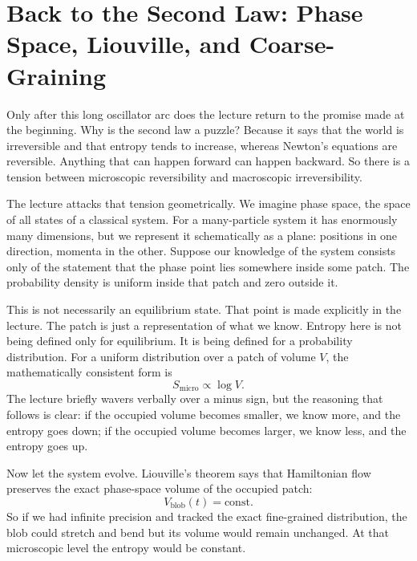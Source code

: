 \section{Back to the Second Law: Phase Space, Liouville, and Coarse-Graining}

Only after this long oscillator arc does the lecture return to the promise made at the beginning. Why is the second law a puzzle? Because it says that the world is irreversible and that entropy tends to increase, whereas Newton's equations are reversible. Anything that can happen forward can happen backward. So there is a tension between microscopic reversibility and macroscopic irreversibility.

The lecture attacks that tension geometrically. We imagine phase space, the space of all states of a classical system. For a many-particle system it has enormously many dimensions, but we represent it schematically as a plane: positions in one direction, momenta in the other. Suppose our knowledge of the system consists only of the statement that the phase point lies somewhere inside some patch. The probability density is uniform inside that patch and zero outside it.

This is not necessarily an equilibrium state. That point is made explicitly in the lecture. The patch is just a representation of what we know. Entropy here is not being defined only for equilibrium. It is being defined for a probability distribution. For a uniform distribution over a patch of volume \(V\), the mathematically consistent form is
\begin{equation}
S_{\mathrm{micro}}\propto \log V.
\end{equation}
The lecture briefly wavers verbally over a minus sign, but the reasoning that follows is clear: if the occupied volume becomes smaller, we know more, and the entropy goes down; if the occupied volume becomes larger, we know less, and the entropy goes up.

Now let the system evolve. Liouville's theorem says that Hamiltonian flow preserves the exact phase-space volume of the occupied patch:
\begin{equation}
V_{\mathrm{blob}}(t)=\text{const}.
\end{equation}
So if we had infinite precision and tracked the exact fine-grained distribution, the blob could stretch and bend but its volume would remain unchanged. At that microscopic level the entropy would be constant.

